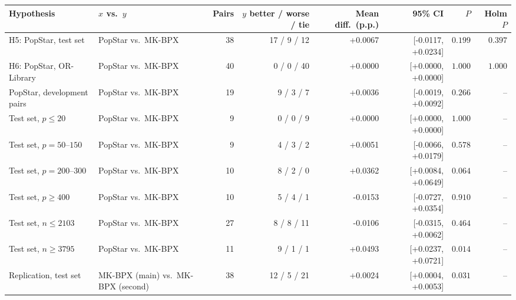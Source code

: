 \begin{tabular}{llrrrrrr}
\toprule
Hypothesis & $x$ vs.\ $y$ & Pairs & $y$ better / worse / tie & Mean diff.\ (p.p.) & 95\% CI & $P$ & Holm $P$ \\
\midrule
H5: PopStar, test set & PopStar vs.\ MK-BPX & 38 & 17 / 9 / 12 & +0.0067 & [-0.0117, +0.0234] & $0.199$ & $0.397$ \\
H6: PopStar, OR-Library & PopStar vs.\ MK-BPX & 40 & 0 / 0 / 40 & +0.0000 & [+0.0000, +0.0000] & $1.000$ & $1.000$ \\
\midrule
PopStar, development pairs & PopStar vs.\ MK-BPX & 19 & 9 / 3 / 7 & +0.0036 & [-0.0019, +0.0092] & $0.266$ & -- \\
Test set, $p\leq 20$ & PopStar vs.\ MK-BPX & 9 & 0 / 0 / 9 & +0.0000 & [+0.0000, +0.0000] & $1.000$ & -- \\
Test set, $p=50$--$150$ & PopStar vs.\ MK-BPX & 9 & 4 / 3 / 2 & +0.0051 & [-0.0066, +0.0179] & $0.578$ & -- \\
Test set, $p=200$--$300$ & PopStar vs.\ MK-BPX & 10 & 8 / 2 / 0 & +0.0362 & [+0.0084, +0.0649] & $0.064$ & -- \\
Test set, $p\geq 400$ & PopStar vs.\ MK-BPX & 10 & 5 / 4 / 1 & -0.0153 & [-0.0727, +0.0354] & $0.910$ & -- \\
Test set, $n\leq 2103$ & PopStar vs.\ MK-BPX & 27 & 8 / 8 / 11 & -0.0106 & [-0.0315, +0.0062] & $0.464$ & -- \\
Test set, $n\geq 3795$ & PopStar vs.\ MK-BPX & 11 & 9 / 1 / 1 & +0.0493 & [+0.0237, +0.0721] & $0.014$ & -- \\
Replication, test set & MK-BPX (main) vs.\ MK-BPX (second) & 38 & 12 / 5 / 21 & +0.0024 & [+0.0004, +0.0053] & $0.031$ & -- \\
\bottomrule
\end{tabular}